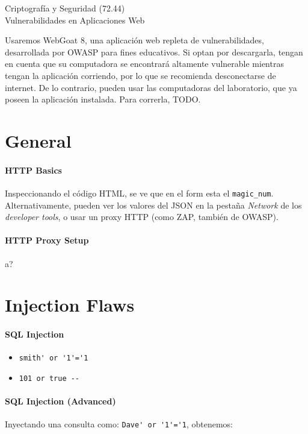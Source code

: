\documentclass{article}
\theoremstyle{definition}
\begin{document}
\begin{center}
\Large Criptografía y Seguridad (72.44)\\[.05cm]
Vulnerabilidades en Aplicaciones Web \\[.05cm]
\the\year
\end{center}

\vspace{0.2 cm}
Usaremos WebGoat 8, una aplicación web repleta de vulnerabilidades,
desarrollada por OWASP para fines educativos. Si optan por descargarla,
tengan en cuenta que su computadora se encontrará altamente vulnerable
mientras tengan la aplicación corriendo, por lo que se recomienda
desconectarse de internet. De lo contrario, pueden usar las computadoras del
laboratorio, que ya poseen la aplicación instalada. Para correrla, TODO.

\section{General}
  \paragraph{HTTP Basics}
    Inspeccionando el código HTML, se ve que en el form esta el \verb+magic_num+.
    Alternativamente, pueden ver los valores del JSON en la pestaña
    \textit{Network} de los \textit{developer tools}, o usar un proxy HTTP (como
    ZAP, también de OWASP).
    \paragraph{HTTP Proxy Setup} a?

\section{Injection Flaws}
\paragraph{SQL Injection} 
\begin{itemize}
    \item \verb+smith' or '1'='1+
    \item \verb+101 or true -- +
\end{itemize}
\paragraph{SQL Injection (Advanced)} 
  Inyectando una consulta como: \verb+Dave' or '1'='1+, obtenemos:
\end{document}
